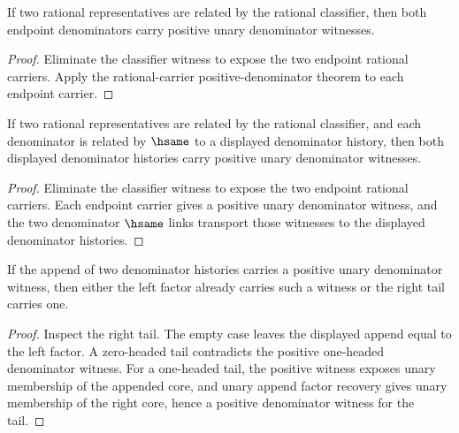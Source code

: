 \begin{theorem}
\label{thm:rat-classifier-positive-denominators}
If two rational representatives are related by the rational classifier, then
both endpoint denominators carry positive unary denominator witnesses.
\end{theorem}
\begin{proof}
Eliminate the classifier witness to expose the two endpoint rational carriers.
Apply the rational-carrier positive-denominator theorem to each endpoint
carrier.
\end{proof}

\begin{theorem}
\label{thm:rat-classifier-denominator-positive-transport}
If two rational representatives are related by the rational classifier, and
each denominator is related by \(\hsame\) to a displayed denominator history,
then both displayed denominator histories carry positive unary denominator
witnesses.
\end{theorem}
\begin{proof}
Eliminate the classifier witness to expose the two endpoint rational carriers.
Each endpoint carrier gives a positive unary denominator witness, and the two
denominator \(\hsame\) links transport those witnesses to the displayed
denominator histories.
\end{proof}

\begin{theorem}
\label{thm:rat-positive-denominator-append-factor-or-tail}
If the append of two denominator histories carries a positive unary denominator
witness, then either the left factor already carries such a witness or the
right tail carries one.
\end{theorem}
\begin{proof}
Inspect the right tail. The empty case leaves the displayed append equal to the
left factor. A zero-headed tail contradicts the positive one-headed
denominator witness. For a one-headed tail, the positive witness exposes unary
membership of the appended core, and unary append factor recovery gives unary
membership of the right core, hence a positive denominator witness for the
tail.
\end{proof}

